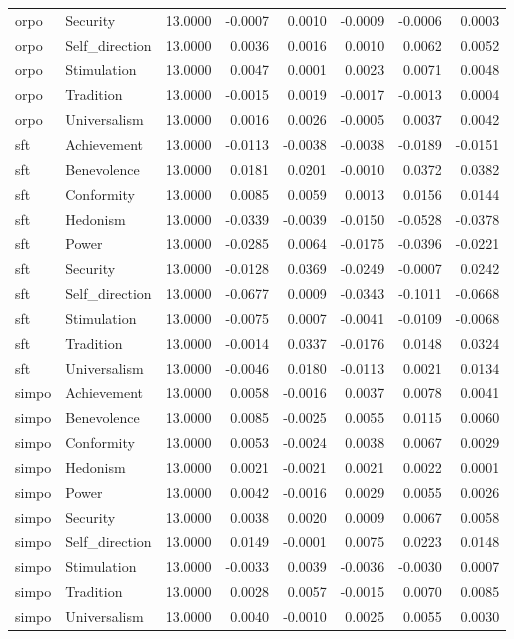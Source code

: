 \begin{tabular}{llrrrrrr}
orpo & Security & 13.0000 & -0.0007 & 0.0010 & -0.0009 & -0.0006 & 0.0003 \\
orpo & Self\_direction & 13.0000 & 0.0036 & 0.0016 & 0.0010 & 0.0062 & 0.0052 \\
orpo & Stimulation & 13.0000 & 0.0047 & 0.0001 & 0.0023 & 0.0071 & 0.0048 \\
orpo & Tradition & 13.0000 & -0.0015 & 0.0019 & -0.0017 & -0.0013 & 0.0004 \\
orpo & Universalism & 13.0000 & 0.0016 & 0.0026 & -0.0005 & 0.0037 & 0.0042 \\
sft & Achievement & 13.0000 & -0.0113 & -0.0038 & -0.0038 & -0.0189 & -0.0151 \\
sft & Benevolence & 13.0000 & 0.0181 & 0.0201 & -0.0010 & 0.0372 & 0.0382 \\
sft & Conformity & 13.0000 & 0.0085 & 0.0059 & 0.0013 & 0.0156 & 0.0144 \\
sft & Hedonism & 13.0000 & -0.0339 & -0.0039 & -0.0150 & -0.0528 & -0.0378 \\
sft & Power & 13.0000 & -0.0285 & 0.0064 & -0.0175 & -0.0396 & -0.0221 \\
sft & Security & 13.0000 & -0.0128 & 0.0369 & -0.0249 & -0.0007 & 0.0242 \\
sft & Self\_direction & 13.0000 & -0.0677 & 0.0009 & -0.0343 & -0.1011 & -0.0668 \\
sft & Stimulation & 13.0000 & -0.0075 & 0.0007 & -0.0041 & -0.0109 & -0.0068 \\
sft & Tradition & 13.0000 & -0.0014 & 0.0337 & -0.0176 & 0.0148 & 0.0324 \\
sft & Universalism & 13.0000 & -0.0046 & 0.0180 & -0.0113 & 0.0021 & 0.0134 \\
simpo & Achievement & 13.0000 & 0.0058 & -0.0016 & 0.0037 & 0.0078 & 0.0041 \\
simpo & Benevolence & 13.0000 & 0.0085 & -0.0025 & 0.0055 & 0.0115 & 0.0060 \\
simpo & Conformity & 13.0000 & 0.0053 & -0.0024 & 0.0038 & 0.0067 & 0.0029 \\
simpo & Hedonism & 13.0000 & 0.0021 & -0.0021 & 0.0021 & 0.0022 & 0.0001 \\
simpo & Power & 13.0000 & 0.0042 & -0.0016 & 0.0029 & 0.0055 & 0.0026 \\
simpo & Security & 13.0000 & 0.0038 & 0.0020 & 0.0009 & 0.0067 & 0.0058 \\
simpo & Self\_direction & 13.0000 & 0.0149 & -0.0001 & 0.0075 & 0.0223 & 0.0148 \\
simpo & Stimulation & 13.0000 & -0.0033 & 0.0039 & -0.0036 & -0.0030 & 0.0007 \\
simpo & Tradition & 13.0000 & 0.0028 & 0.0057 & -0.0015 & 0.0070 & 0.0085 \\
simpo & Universalism & 13.0000 & 0.0040 & -0.0010 & 0.0025 & 0.0055 & 0.0030 \\
\bottomrule
\end{tabular}
